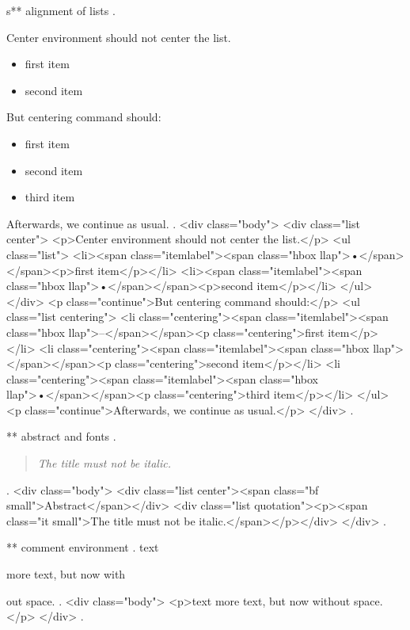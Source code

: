 s** alignment of lists
.
\begin{center}
    Center environment should not center the list.
    \begin{itemize}
        \item first item
        \item second item
    \end{itemize}
\end{center}
But centering command should:
\begin{itemize}
    \centering
    \item[\textendash] first item
    \item[] second item
    \item third item
\end{itemize}
Afterwards, we continue as usual.
.
<div class="body">
<div class="list center">
<p>Center environment should not center the list.</p>
<ul class="list">
<li><span class="itemlabel"><span class="hbox llap">•</span></span><p>ﬁrst item</p></li>
<li><span class="itemlabel"><span class="hbox llap">•</span></span><p>second item</p></li>
</ul>
</div>
<p class="continue">But centering command should:</p>
<ul class="list centering">
<li class="centering"><span class="itemlabel"><span class="hbox llap">–</span></span><p class="centering">ﬁrst item</p></li>
<li class="centering"><span class="itemlabel"><span class="hbox llap"></span></span><p class="centering">second item</p></li>
<li class="centering"><span class="itemlabel"><span class="hbox llap">•</span></span><p class="centering">third item</p></li>
</ul>
<p class="continue">Afterwards, we continue as usual.</p>
</div>
.


** abstract and fonts
.
\begin{abstract}
\itshape
The title must not be italic.
\end{abstract}
.
<div class="body">
<div class="list center"><span class="bf small">Abstract</span></div>
<div class="list quotation"><p><span class="it small">The title must not be italic.</span></p></div>
</div>
.


** comment environment
.
text
\begin{comment}
    This is a comment.
    \end{comment
    still more comment.
\end{comment}
more text, but now with%
\begin{comment}
    This is a comment.
\end{comment}
out space.
.
<div class="body">
<p>text more text, but now without space.</p>
</div>
.
